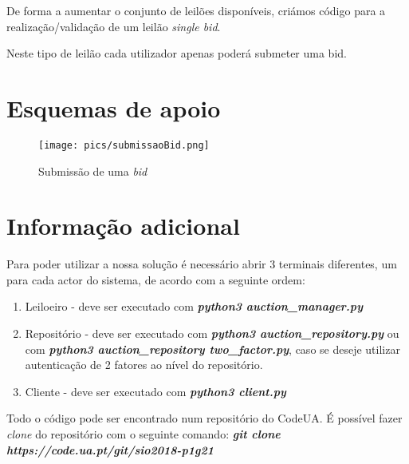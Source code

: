 \documentclass[12pt]{article}
\begin{document}
\par De forma a aumentar o conjunto de leilões disponíveis, criámos código para a realização/validação de um leilão \textit{single bid}.

\par Neste tipo de leilão cada utilizador apenas poderá submeter uma bid.


\pagebreak

\section{Esquemas de apoio}

\vspace{5mm} %

\begin{figure}[h!]
    \centering
    \texttt{[image: pics/submissaoBid.png]}
    \caption{Submissão de uma \textit{bid}}
\end{figure}




\pagebreak

\section{Informação adicional}

Para poder utilizar a nossa solução é necessário abrir 3 terminais diferentes, um para cada actor do sistema, de acordo com a seguinte ordem:


\vspace{5mm} %
\begin{enumerate}
    \item Leiloeiro - deve ser executado com \textbf{\textit{python3 auction\_manager.py}}
    
    \item Repositório - deve ser executado com \textbf{\textit{python3 auction\_repository.py}} ou com \textbf{\textit{python3 auction\_repository two\_factor.py}}, caso se deseje utilizar autenticação de 2 fatores ao nível do repositório.
    
    \item Cliente - deve ser executado com \textbf{\textit{python3 client.py}}
\end{enumerate}
\vspace{5mm} %

Todo o código pode ser encontrado num repositório do CodeUA. É possível fazer \textit{clone} do repositório com o seguinte comando:  \textbf{\textit{git clone  https://code.ua.pt/git/sio2018-p1g21}}
\end{document}
